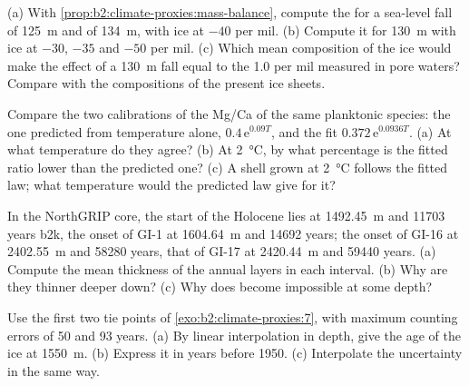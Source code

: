\begin{exercise}[$\star\star$]\label{exo:b2:climate-proxies:5}
(a) With \cref{prop:b2:climate-proxies:mass-balance}, compute the  for a sea-level
fall of \qty{125}{m} and of \qty{134}{m}, with ice at $-40$ per mil. (b) Compute it for
\qty{130}{m} with ice at $-30$, $-35$ and $-50$ per mil. (c) Which mean composition of the ice
would make the effect of a \qty{130}{m} fall equal to the \num{1.0} per mil measured in pore
waters? Compare with the compositions of the present ice sheets.
\end{exercise}

\begin{exercise}[$\star\star$]\label{exo:b2:climate-proxies:6}
Compare the two calibrations of the Mg/Ca of the same planktonic species: the one predicted from
temperature alone, $0.4\,\mathrm{e}^{0.09T}$, and the fit $0.372\,\mathrm{e}^{0.0936T}$. (a) At
what temperature do they agree? (b) At \qty{2}{\celsius}, by what percentage is the fitted ratio
lower than the predicted one? (c) A shell grown at \qty{2}{\celsius} follows the fitted law; what
temperature would the predicted law give for it?
\end{exercise}

\begin{exercise}[$\star\star$]\label{exo:b2:climate-proxies:7}
In the NorthGRIP core, the start of the Holocene lies at \qty{1492.45}{m} and \num{11703} years
b2k, the onset of GI-1 at \qty{1604.64}{m} and \num{14692} years; the onset of GI-16 at
\qty{2402.55}{m} and \num{58280} years, that of GI-17 at \qty{2420.44}{m} and \num{59440} years.
(a) Compute the mean thickness of the annual layers in each interval. (b) Why are they thinner
deeper down? (c) Why does  become impossible at some depth?
\end{exercise}

\begin{exercise}[$\star\star$]\label{exo:b2:climate-proxies:8}
Use the first two tie points of \cref{exo:b2:climate-proxies:7}, with maximum counting errors of 50
and 93 years. (a) By linear interpolation in depth, give the age of the ice at \qty{1550}{m}.
(b) Express it in years before 1950. (c) Interpolate the uncertainty in the same way.
\end{exercise}

